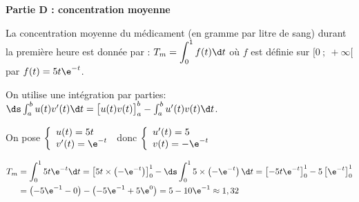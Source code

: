 \medskip

\textbf{Partie D : concentration moyenne}

\medskip

La concentration moyenne du médicament (en gramme par litre de sang) durant la première heure est donnée par :
$T_m = \displaystyle\int_0^1 f(t) \d t$
où $f$ est définie sur $[0~;~+\infty[$ par $f(t) = 5t\e^{-t}$.


On utilise une intégration par parties:
$\ds\int_{a}^{b} u(t)v'(t)\d t =\left [ u(t)v(t)\strut \right ]_{a}^{b} -\int_{a}^{b} u'(t) v(t) \d t$.

On pose
$\left \{
\begin{array}{l}
u(t)=5t\\
v'(t)=\e^{-t}
\end{array}
\right .$
donc
$\left \{
\begin{array}{l}
u'(t)=5\\
v(t)= - \e^{-t}
\end{array}
\right .$

$\aligned[t]
T_m
& = \displaystyle\int_0^1 5t\e^{-t} \d t
 = \left [5t\times \left (-\e^{-t} \right )\right ]_{0}^{1}- \ds\int_{0}^{1} 5\times \left ( -\e^{-t} \right ) \d t
  = \left [-5 t\e^{-t} \right ]_{0}^{1}- 5\left [ \e^{-t} \right ]_{0}^{1}\\
& = \left (-5\e^{-1}-0\right )-\left (-5\e^{-1} + 5\e^{0} \right )
= 5-10\e^{-1} \approx 1,32
\endaligned$


\bigskip

